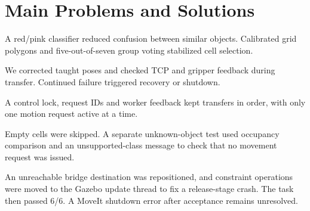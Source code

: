 \Needspace{0.58\textheight}
\section{Main Problems and Solutions}
\label{sec:problems}
 A red/pink classifier reduced confusion between similar objects. Calibrated grid polygons and five-out-of-seven group voting stabilized cell selection.

 We corrected taught poses and checked TCP and gripper feedback during transfer. Continued failure triggered recovery or shutdown.

 A control lock, request IDs and worker feedback kept transfers in order, with only one motion request active at a time.

 Empty cells were skipped. A separate unknown-object test used occupancy comparison and an unsupported-class message to check that no movement request was issued.

 An unreachable bridge destination was repositioned, and constraint operations were moved to the Gazebo update thread to fix a release-stage crash. The task then passed 6/6. A MoveIt shutdown error after acceptance remains unresolved.
